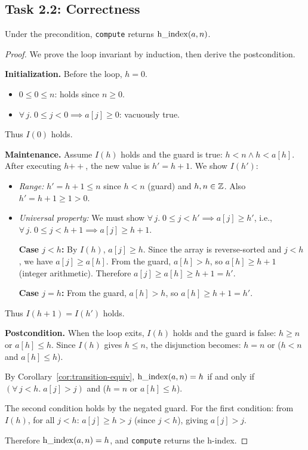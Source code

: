 \subsection{Task 2.2: Correctness}

\begin{theorem}\label{thm:compute-correct}
Under the precondition, \texttt{compute} returns $\operatorname{h\_index}(a, n)$.
\end{theorem}

\begin{proof}
We prove the loop invariant by induction, then derive the postcondition.

\medskip\noindent
\textbf{Initialization.}
Before the loop, $h = 0$.
\begin{itemize}
  \item $0 \leq 0 \leq n$: holds since $n \geq 0$.
  \item $\forall\, j.\; 0 \leq j < 0 \implies a[j] \geq 0$: vacuously true.
\end{itemize}
Thus $I(0)$ holds.

\medskip\noindent
\textbf{Maintenance.}
Assume $I(h)$ holds and the guard is true: $h < n \wedge h < a[h]$.
After executing $h \mathrel{{+}{+}}$, the new value is $h' = h + 1$. We show $I(h')$:
\begin{itemize}
  \item \emph{Range:} $h' = h + 1 \leq n$ since $h < n$ (guard) and $h, n \in \mathbb{Z}$.
    Also $h' = h + 1 \geq 1 > 0$.
  \item \emph{Universal property:} We must show $\forall\, j.\; 0 \leq j < h' \implies a[j] \geq h'$,
    i.e., $\forall\, j.\; 0 \leq j < h + 1 \implies a[j] \geq h + 1$.

    \textbf{Case $j < h$:}
    By $I(h)$, $a[j] \geq h$.
    Since the array is reverse-sorted and $j < h$, we have $a[j] \geq a[h]$.
    From the guard, $a[h] > h$, so $a[h] \geq h + 1$ (integer arithmetic).
    Therefore $a[j] \geq a[h] \geq h + 1 = h'$.

    \textbf{Case $j = h$:}
    From the guard, $a[h] > h$, so $a[h] \geq h + 1 = h'$.
\end{itemize}
Thus $I(h + 1) = I(h')$ holds.

\medskip\noindent
\textbf{Postcondition.}
When the loop exits, $I(h)$ holds and the guard is false:
$h \geq n$ or $a[h] \leq h$.
Since $I(h)$ gives $h \leq n$, the disjunction becomes: $h = n$ or ($h < n$ and $a[h] \leq h$).

By Corollary~\ref{cor:transition-equiv}, $\operatorname{h\_index}(a,n) = h$ if and only if
$(\forall\, j < h.\; a[j] > j)$ and ($h = n$ or $a[h] \leq h$).

The second condition holds by the negated guard. For the first condition:
from $I(h)$, for all $j < h$: $a[j] \geq h > j$ (since $j < h$), giving $a[j] > j$.

Therefore $\operatorname{h\_index}(a,n) = h$, and \texttt{compute} returns the h-index.
\end{proof}

